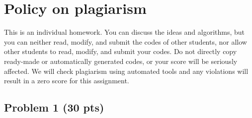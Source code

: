\documentclass[11pt,letterpaper]{article}
\begin{document}
\section{Policy on plagiarism}
This is an individual homework. You can discuss the ideas and algorithms, but you can neither read, modify, and submit the codes of other students, nor allow other students to read, modify, and submit your codes. Do not directly copy ready-made or automatically generated codes, or your score will be seriously affected. We will check plagiarism using automated tools and any violations will result in a zero score for this assignment. 

\clearpage


\subsection*{Problem 1 (30 pts)}
\end{document}
